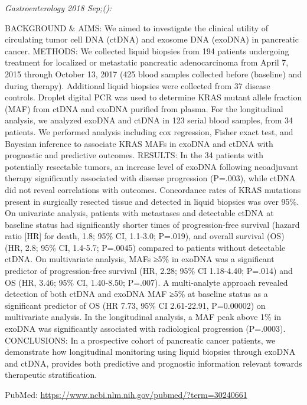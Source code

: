 \documentclass[]{article}
\begin{document}
\emph{Gastroenterology 2018 Sep;():}

BACKGROUND \& AIMS: We aimed to investigate the clinical utility of
circulating tumor cell DNA (ctDNA) and exosome DNA (exoDNA) in
pancreatic cancer. METHODS: We collected liquid biopsies from 194
patients undergoing treatment for localized or metastatic pancreatic
adenocarcinoma from April 7, 2015 through October 13, 2017 (425 blood
samples collected before (baseline) and during therapy). Additional
liquid biopsies were collected from 37 disease controls. Droplet digital
PCR was used to determine KRAS mutant allele fraction (MAF) from ctDNA
and exoDNA purified from plasma. For the longitudinal analysis, we
analyzed exoDNA and ctDNA in 123 serial blood samples, from 34 patients.
We performed analysis including cox regression, Fisher exact test, and
Bayesian inference to associate KRAS MAFs in exoDNA and ctDNA with
prognostic and predictive outcomes. RESULTS: In the 34 patients with
potentially resectable tumors, an increase level of exoDNA following
neoadjuvant therapy significantly associated with disease progression
(P=.003), while ctDNA did not reveal correlations with outcomes.
Concordance rates of KRAS mutations present in surgically resected
tissue and detected in liquid biopsies was over 95\%. On univariate
analysis, patients with metastases and detectable ctDNA at baseline
status had significantly shorter times of progression-free survival
(hazard ratio {[}HR{]} for death, 1.8; 95\% CI, 1.1-3.0; P=.019), and
overall survival (OS) (HR, 2.8; 95\% CI, 1.4-5.7; P=.0045) compared to
patients without detectable ctDNA. On multivariate analysis, MAFs ≥5\%
in exoDNA was a significant predictor of progression-free survival (HR,
2.28; 95\% CI 1.18-4.40; P=.014) and OS (HR, 3.46; 95\% CI, 1.40-8.50;
P=.007). A multi-analyte approach revealed detection of both ctDNA and
exoDNA MAF ≥5\% at baseline status as a significant predictor of OS (HR
7.73, 95\% CI 2.61-22.91, P=0.00002) on multivariate analysis. In the
longitudinal analysis, a MAF peak above 1\% in exoDNA was significantly
associated with radiological progression (P=.0003). CONCLUSIONS: In a
prospective cohort of pancreatic cancer patients, we demonstrate how
longitudinal monitoring using liquid biopsies through exoDNA and ctDNA,
provides both predictive and prognostic information relevant towards
therapeutic stratification.

PubMed: \url{https://www.ncbi.nlm.nih.gov/pubmed/?term=30240661}

{}

{}
\end{document}
